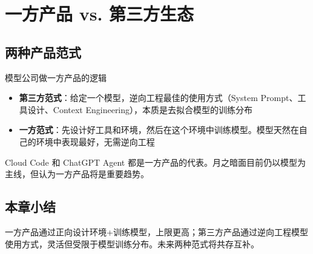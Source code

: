 \section{一方产品 vs. 第三方生态}

\subsection{两种产品范式}

\begin{importantbox}{模型公司做一方产品的逻辑}
\begin{itemize}
    \item \textbf{第三方范式}：给定一个模型，逆向工程最佳的使用方式（System Prompt、工具设计、Context Engineering），本质是去拟合模型的训练分布
    \item \textbf{一方范式}：先设计好工具和环境，然后在这个环境中训练模型。模型天然在自己的环境中表现最好，无需逆向工程
\end{itemize}
Cloud Code 和 ChatGPT Agent 都是一方产品的代表。月之暗面目前仍以模型为主线，但认为一方产品将是重要趋势。
\end{importantbox}

\subsection{本章小结}

一方产品通过正向设计环境+训练模型，上限更高；第三方产品通过逆向工程模型使用方式，灵活但受限于模型训练分布。未来两种范式将共存互补。


